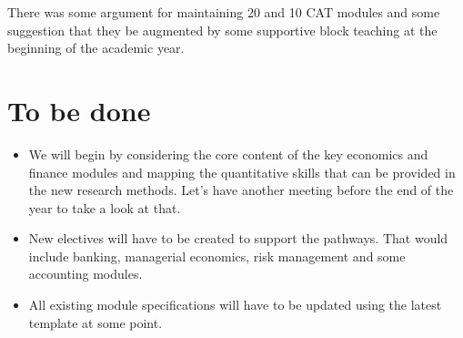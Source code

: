 \documentclass[9pt, a4paper, oneside]{article} %
\begin{document}
\begin{figure}[h]
\end{figure}
There was some argument for maintaining 20 and 10 CAT modules and some suggestion that they be augmented by some supportive block teaching at the beginning of the academic year. 

\section*{To be done}

\begin{itemize}
\item We will begin by considering the core content of the key economics and finance modules and mapping the quantitative skills that can be provided in the new research methods.  Let's have another meeting before the end of the year to take a look at that.  
\item New electives will have to be created to support the pathways.  That would include banking, managerial economics, risk management and some accounting modules. 
\item All existing module specifications will have to be updated using the latest template at some point. 
\end{itemize}
\end{document}
